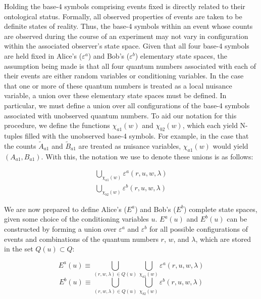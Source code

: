 \documentclass{article}
\begin{document}
Holding the base-4 symbols comprising events fixed is directly related to their ontological status. Formally, all observed properties of events are taken to be definite states of reality. Thus, the base-4 symbols within an event whose counts are observed during the course of an experiment may not vary in configuration within the associated observer's state space. Given that all four base-4 symbols are held fixed in Alice's ($\varepsilon^a$) and Bob's ($\varepsilon^b$) elementary state spaces, the assumption being made is that all four quantum numbers associated with each of their events are either random variables or conditioning variables. In the case that one or more of these quantum numbers is treated as a local nuisance variable, a union over these elementary state spaces must be defined. In particular, we must define a union over all configurations of the base-4 symbols associated with unobserved quantum numbers. To aid our notation for this procedure, we define the functions $\chi_{a1}(w)$ and $\chi_{b2}(w)$, which each yield N-tuples filled with the unobserved base-4 symbols. For example, in the case that the counts $\tilde{A}_{a1}$ and $\tilde{B}_{a1}$ are treated as nuisance variables, $\chi_{a1}(w)$ would yield $(A_{a1},B_{a1})$. With this, the notation we use to denote these unions is as follows:

\begin{equation}
\begin{array}{cc}
     \bigcup_{\chi_{a1}(w)}\varepsilon^a(r,u,w,\lambda)\\
     \bigcup_{\chi_{b2}(w)}\varepsilon^b(r,u,w,\lambda)
\end{array}
\end{equation}

We are now prepared to define Alice's ($E^a$) and Bob's ($E^b$) complete state spaces, given some choice of the conditioning variables $u$. $E^a(u)$ and $E^b(u)$ can be constructed by forming a union over $\varepsilon^a$ and $\varepsilon^b$ for all possible configurations of events and combinations of the quantum numbers $r$, $w$, and $\lambda$, which are stored in the set $Q(u)\subset Q$:  

\begin{equation}
E^{a}(u)\equiv\bigcup_{(r,w,\lambda)\in Q(u)}\bigcup_{\chi_{a1}(w)}\varepsilon^{a}(r,u,w,\lambda)
\label{eq: Full state space Alice}
\end{equation}
\begin{equation}
E^{b}(u)\equiv\bigcup_{(r,w,\lambda)\in Q(u)}\bigcup_{\chi_{b2}(w)}\varepsilon^{b}(r,u,w,\lambda)
\label{eq: Full state space Bob}
\end{equation}
\end{document}
